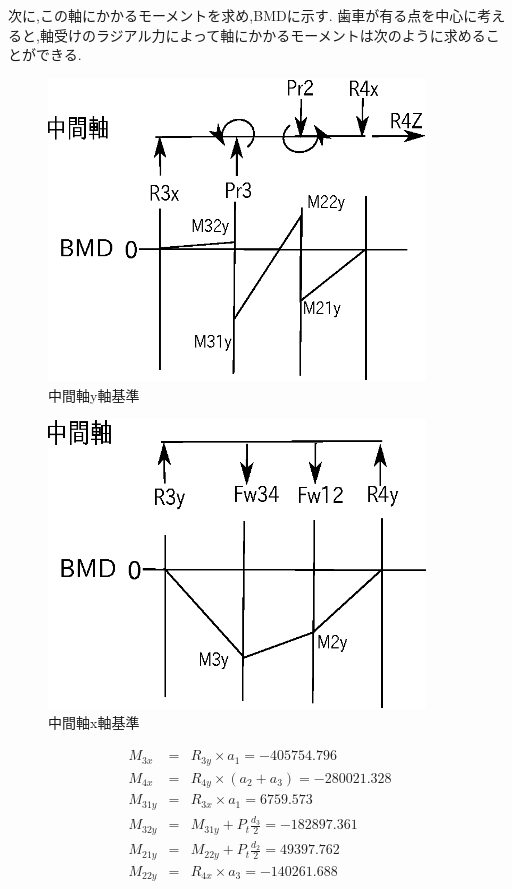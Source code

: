 \documentclass[a4j,twoside,openright,11pt]{jreport}
\begin{document}
次に,この軸にかかるモーメントを求め,BMDに示す.
歯車が有る点を中心に考えると,軸受けのラジアル力によって軸にかかるモーメントは次のように求めることができる.
\begin{figure}[htbp]
\begin{center}
\includegraphics[width=10cm]{jiku47.eps}
\end{center}
\caption{中間軸y軸基準}
\end{figure}
\begin{figure}[htbp]
\begin{center}
\includegraphics[width=10cm]{jiku45.eps}
\end{center}
\caption{中間軸x軸基準}
\end{figure}
\begin{eqnarray}
M_{3x} &=& R_{3y} \times a_1=-405754.796\\
M_{4x} &=& R_{4y} \times (a_2+a_3)=-280021.328\\
M_{31y} &=& R_{3x} \times a_1=6759.573\\
M_{32y} &=& M_{31y} + P_t \frac{d_3}{2}=-182897.361\\
M_{21y} &=& M_{22y} + P_t \frac{d_2}{2}=49397.762\\
M_{22y} &=& R_{4x} \times a_3=-140261.688
\end{eqnarray}
\end{document}
